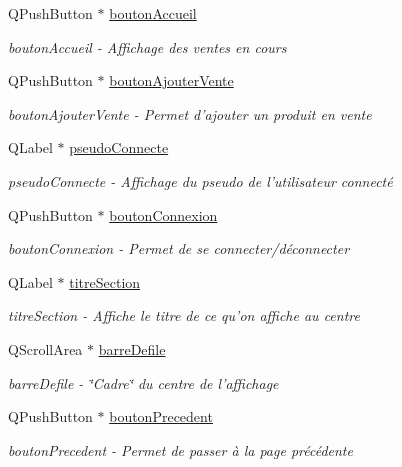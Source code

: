 \begin{DoxyCompactItemize}
Q\-Push\-Button $\ast$ \hyperlink{class_ma_fenetre_a0316aa06b89b812a8528a8ccbe81561a}{bouton\-Accueil}
\begin{DoxyCompactList}\small\item\em bouton\-Accueil -\/ Affichage des ventes en cours \end{DoxyCompactList}\item 
Q\-Push\-Button $\ast$ \hyperlink{class_ma_fenetre_a422d1e619aa51ff42b5ecd2c5476ce19}{bouton\-Ajouter\-Vente}
\begin{DoxyCompactList}\small\item\em bouton\-Ajouter\-Vente -\/ Permet d'ajouter un produit en vente \end{DoxyCompactList}\item 
Q\-Label $\ast$ \hyperlink{class_ma_fenetre_ae7932944c172401e793af721335e7c3d}{pseudo\-Connecte}
\begin{DoxyCompactList}\small\item\em pseudo\-Connecte -\/ Affichage du pseudo de l'utilisateur connecté \end{DoxyCompactList}\item 
Q\-Push\-Button $\ast$ \hyperlink{class_ma_fenetre_a6654bb6885a843d1a6ad9399eb7d0c36}{bouton\-Connexion}
\begin{DoxyCompactList}\small\item\em bouton\-Connexion -\/ Permet de se connecter/déconnecter \end{DoxyCompactList}\item 
Q\-Label $\ast$ \hyperlink{class_ma_fenetre_ac4749f9608f7c8d6e5d60434ddbedfc5}{titre\-Section}
\begin{DoxyCompactList}\small\item\em titre\-Section -\/ Affiche le titre de ce qu'on affiche au centre \end{DoxyCompactList}\item 
Q\-Scroll\-Area $\ast$ \hyperlink{class_ma_fenetre_a4f199f65ae682c48c837875a486d2f3f}{barre\-Defile}
\begin{DoxyCompactList}\small\item\em barre\-Defile -\/ \char`\"{}\-Cadre\char`\"{} du centre de l'affichage \end{DoxyCompactList}\item 
Q\-Push\-Button $\ast$ \hyperlink{class_ma_fenetre_a53b01801ba121b8240df4f1f8c9330b3}{bouton\-Precedent}
\begin{DoxyCompactList}\small\item\em bouton\-Precedent -\/ Permet de passer à la page précédente \end{DoxyCompactList}\item 

\end{DoxyCompactItemize}

